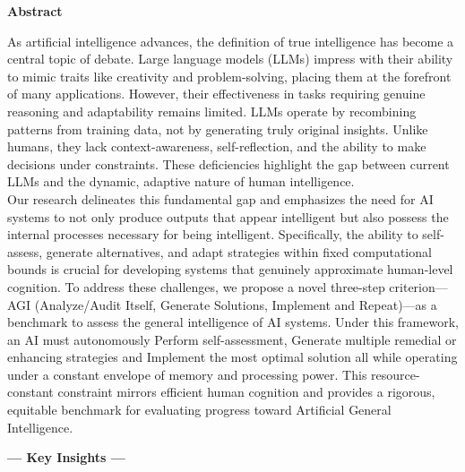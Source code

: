 \documentclass[11pt]{scrartcl}
\begin{document}
\begin{center}
\begin{Huge}
\textbf{Abstract}
\end{Huge}
\end{center}
As artificial intelligence advances, the definition of true intelligence has become a central topic of debate. Large language models (LLMs) impress with their ability to mimic traits like creativity and problem-solving, placing them at the forefront of many applications. However, their effectiveness in tasks requiring genuine reasoning and adaptability remains limited. LLMs operate by recombining patterns from training data, not by generating truly original insights. Unlike humans, they lack context-awareness, self-reflection, and the ability to make decisions under constraints. These deficiencies highlight the gap between current LLMs and the dynamic, adaptive nature of human intelligence. \\
Our research delineates this fundamental gap and emphasizes the need for AI systems to not only produce outputs that appear intelligent but also possess the internal processes necessary for being intelligent. Specifically, the ability to self-assess, generate alternatives, and adapt strategies within fixed computational bounds is crucial for developing systems that genuinely approximate human-level cognition. To address these challenges, we propose a novel three-step criterion—AGI (Analyze/Audit Itself, Generate Solutions, Implement and Repeat)—as a benchmark to assess the general intelligence of AI systems. Under this framework, an AI must autonomously Perform self-assessment, Generate multiple remedial or enhancing strategies and Implement the most optimal solution all while operating under a constant envelope of memory and processing power. This resource-constant constraint mirrors efficient human cognition and provides a rigorous, equitable benchmark for evaluating progress toward Artificial General Intelligence.

\vspace{1cm}

\begin{center}
\begin{huge}
\textbf{— Key Insights —}
\end{huge}
\end{center}
\end{document}
